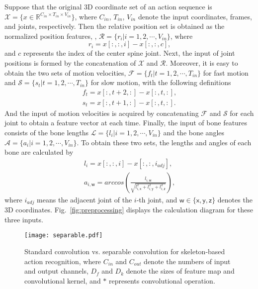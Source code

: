 \documentclass[10pt,journal,compsoc]{IEEEtran}
\begin{document}
Suppose that the original 3D coordinate set of an action sequence is $\mathcal{X}=\{x\in \mathbb{R}^{C_{in}\times T_{in}\times V_{in}}\}$, where $C_{in}$, $T_{in}$, $V_{in}$ denote the input coordinates, frames, and joints, respectively. Then the relative position set is obtained as the normalized position features, \ie, $\mathcal{R}=\{r_{i}|i=1,2,\cdots,V_{in}\}$, where
\begin{equation}
  r_i=x[:,:,i]-x[:,:,c],
\end{equation}
and $c$ represents the index of the center spine joint. Next, the input of joint positions is formed by the concatenation of $\mathcal{X}$ and $\mathcal{R}$. Moreover, it is easy to obtain the two sets of motion velocities, $\mathcal{F}=\{f_t|t=1,2,\cdots,T_{in}\}$ for fast motion and $\mathcal{S}=\{s_t|t=1,2,\cdots,T_{in}\}$ for slow motion, with the following definitions
\begin{equation}
  \begin{matrix}
    f_t=x[:,t+2,:]-x[:,t,:], \\
    s_t=x[:,t+1,:]-x[:,t,:].
  \end{matrix}
\end{equation}
And the input of motion velocities is acquired by concatenating $\mathcal{F}$ and $\mathcal{S}$ for each joint to obtain a feature vector at each time. Finally, the input of bone features consists of the bone lengths $\mathcal{L}=\{l_i|i=1,2,\cdots,V_{in}\}$ and the bone angles $\mathcal{A}=\{a_i|i=1,2,\cdots,V_{in}\}$. To obtain these two sets, the lengths and angles of each bone are calculated by
\begin{equation}
  \begin{matrix}
    l_i=x[:,:,i]-x[:,:,i_{adj}], \\
    a_{i,\mathsf{w}}=arccos(\frac{l_{i,\mathsf{w}}}{\sqrt{l_{i,\mathsf{x}}^2+l_{i,\mathsf{y}}^2+l_{i,\mathsf{z}}^2}}),
  \end{matrix}
\end{equation}
where $i_{adj}$ means the adjacent joint of the $i$-th joint, and $\mathsf{w}\in\{\mathsf{x},\mathsf{y},\mathsf{z}\}$ denotes the 3D coordinates. Fig.~\ref{fig:preprocessing} displays the calculation diagram for these three inputs.

\begin{figure}[t]
  \vspace{-0.2cm}
  \centerline{\texttt{[image: separable.pdf]}}
  \vspace{-0.4cm}
  \caption{Standard convolution vs. separable convolution for skeleton-based action recognition, where $C_{in}$ and $C_{out}$ denote the numbers of input and output channels, $D_f$ and $D_k$ denote the sizes of feature map and convolutional kernel, and $*$ represents convolutional operation.\bv}\label{fig:separable}
  \vspace{-0.4cm}
\end{figure}
\end{document}
